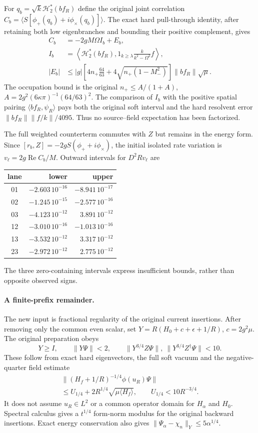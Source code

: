 For $q_b=\sqrt k\mathcal H_2^*(bf_R)$ define the original joint
correlation $C_b=\langle S[\phi_+(q_b)+i\phi_\times(q_b)]\rangle$.
The exact hard pull-through identity, after retaining both low eigenbranches
and bounding their positive complement, gives
\begin{align*}
 C_b&=-2gM\Omega I_b+E_b,\\
 I_b&=\left\langle\mathcal H_2^*(bf_R),
       1_{k\ge\lambda}\frac{k}{k^2-\Omega^2}f\right\rangle,\\
 |E_b|&\le |g|\left[4n_+\frac{64}{63}
              +4\sqrt{n_+(1-M_-^2)}\right]\|bf_R\|\sqrt\mu.
\end{align*}
The occupation bound is the original
$n_+\le A/(1+A)$, $A=2g^2(6\kappa\pi)^{-1}(64/63)^2$.
The comparison of $I_b$ with the positive spatial pairing
$\langle bf_R,\psi_R\rangle$ pays both the original soft interval and
the hard resolvent error $\|bf_R\|\|f/k\|/4095$.
Thus no source--field expectation has been factorized.

The full weighted counterterm commutes with $Z$ but remains in the energy
form. Since $[r_b,Z]=-2gS(\phi_++i\phi_\times)$, the initial isolated
rate variation is $v_\ell=2g\operatorname{Re}C_b/M$.
Outward intervals for $D^2Rv_\ell$ are
\begin{center}
\begin{tabular}{c@{\quad}rr}
lane&lower&upper\\\hline
01&$-2.603\,10^{-16}$&$-8.941\,10^{-17}$\\
02&$-1.245\,10^{-15}$&$-2.577\,10^{-16}$\\
03&$-4.123\,10^{-12}$&$ 3.891\,10^{-12}$\\
12&$-3.010\,10^{-16}$&$-1.013\,10^{-16}$\\
13&$-3.532\,10^{-12}$&$ 3.317\,10^{-12}$\\
23&$-2.972\,10^{-12}$&$ 2.775\,10^{-12}$
\end{tabular}
\end{center}
The three zero-containing intervals express insufficient bounds, rather
than opposite observed signs.

\paragraph{A finite-prefix remainder.}
The new input is fractional regularity of the original current insertions.
After removing only the common even scalar, set
$Y=R(H_0+c+\epsilon+1/R)$, $c=2g^2\mu$. The original preparation obeys
\[
 Y\ge I,\qquad \|Y\Psi\|<2,\qquad
 \|Y^{3/4}Z\Psi\|,\ \|Y^{3/4}Z^\dagger\Psi\|<10.
\]
These follow from exact hard eigenvectors, the full soft vacuum and the
negative-quarter field estimate
\[
 \begin{gathered}
 \|(H_f+1/R)^{-1/4}\phi(u_R)\Psi\|\\
 \le U_{1/4}+2R^{1/4}\sqrt{\mu\langle H_f\rangle},\qquad
 U_{1/4}<10R^{-3/4}.
 \end{gathered}
\]
It does not assume $u_R\in L^2$ or a common operator domain for $H_\alpha$
and $H_0$. Spectral calculus gives a $t^{1/4}$ form-norm modulus for the
original backward insertions. Exact energy conservation also gives
$\|\Psi_\alpha-\chi_n\|_Y\le5\alpha^{1/4}$.

